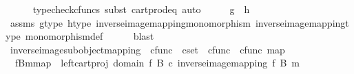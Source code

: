 \begin{isabellebody}
\ \ \ \ \isamarkupfalse%
\ {\isacharparenleft}{\kern0pt}typecheck{\isacharunderscore}{\kern0pt}cfuncs{\isacharcomma}{\kern0pt}\ subst\ cart{\isacharunderscore}{\kern0pt}prod{\isacharunderscore}{\kern0pt}eq{\isacharcomma}{\kern0pt}\ auto{\isacharparenright}{\kern0pt}\isanewline
\ \ \isamarkupfalse%
\ \isamarkupfalse%
\ {\isachardoublequoteopen}g\ {\isacharequal}{\kern0pt}\ h{\isachardoublequoteclose}\isanewline
\ \ \ \ \isamarkupfalse%
\ assms\ g{\isacharunderscore}{\kern0pt}type\ h{\isacharunderscore}{\kern0pt}type\ inverse{\isacharunderscore}{\kern0pt}image{\isacharunderscore}{\kern0pt}mapping{\isacharunderscore}{\kern0pt}monomorphism\ inverse{\isacharunderscore}{\kern0pt}image{\isacharunderscore}{\kern0pt}mapping{\isacharunderscore}{\kern0pt}type\ monomorphism{\isacharunderscore}{\kern0pt}def{}\isanewline
\ \ \ \ \isamarkupfalse%
\ blast\isanewline
{}\isamarkupfalse%
%
\endisatagproof
{\isafoldproof}%
%
\isadelimproof
\isanewline
%
\endisadelimproof
\isanewline
{}\isamarkupfalse%
\ inverse{\isacharunderscore}{\kern0pt}image{\isacharunderscore}{\kern0pt}subobject{\isacharunderscore}{\kern0pt}mapping\ {\isacharcolon}{\kern0pt}{\isacharcolon}{\kern0pt}\ {\isachardoublequoteopen}cfunc\ {\isasymRightarrow}\ cset\ {\isasymRightarrow}\ cfunc\ {\isasymRightarrow}\ cfunc{\isachardoublequoteclose}\ {\isacharparenleft}{\kern0pt}{\isachardoublequoteopen}{\isacharbrackleft}{\kern0pt}{\isacharunderscore}{\kern0pt}\isactrlsup {\isacharminus}{\kern0pt}\isactrlbsub {\isacharunderscore}{\kern0pt}\isactrlesub {\isacharbrackright}{\kern0pt}map{\isachardoublequoteclose}\ {\isacharbrackleft}{\kern0pt}{}{}{}{\isacharcomma}{\kern0pt}{}{\isacharcomma}{\kern0pt}{}{\isacharbrackright}{\kern0pt}{}{}{}{\isacharparenright}{\kern0pt}\ \isanewline
\ \ {\isachardoublequoteopen}{\isacharbrackleft}{\kern0pt}f\isactrlsup {\isacharminus}{\kern0pt}B{\isasymrparr}\isactrlbsub m\isactrlesub {\isacharbrackright}{\kern0pt}map\ {\isacharequal}{\kern0pt}\ left{\isacharunderscore}{\kern0pt}cart{\isacharunderscore}{\kern0pt}proj\ {\isacharparenleft}{\kern0pt}domain\ f{\isacharparenright}{\kern0pt}\ B\ {\isasymcirc}\isactrlsub c\ inverse{\isacharunderscore}{\kern0pt}image{\isacharunderscore}{\kern0pt}mapping\ f\ B\ m{\isachardoublequoteclose}\isanewline

\end{isabellebody}

